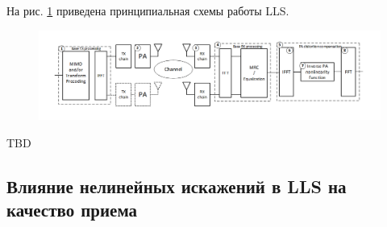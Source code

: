 На рис. \ref{fig:lls_scheme} приведена принципиальная схемы работы LLS.
\begin{figure}[h!]
    \centering
    \includegraphics[width=0.99\linewidth]{figs/lls_scheme.png}
    \caption{}
    \label{fig:lls_scheme}
\end{figure}

TBD







\subsection{Влияние нелинейных искажений в LLS на качество приема}

